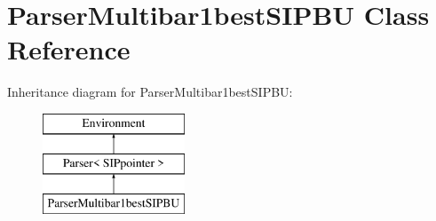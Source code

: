 \hypertarget{classParserMultibar1bestSIPBU}{}\section{Parser\+Multibar1best\+S\+I\+P\+BU Class Reference}
\label{classParserMultibar1bestSIPBU}
Inheritance diagram for Parser\+Multibar1best\+S\+I\+P\+BU\+:\begin{figure}[H]
\begin{center}
\leavevmode
\includegraphics[height=3.000000cm]{classParserMultibar1bestSIPBU}
\end{center}
\end{figure}
